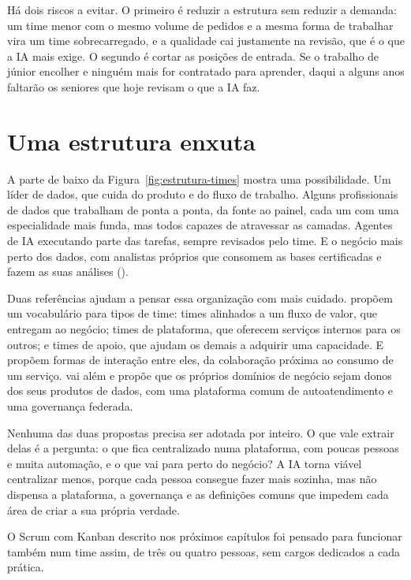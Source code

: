 Há dois riscos a evitar. O primeiro é reduzir a estrutura sem reduzir a demanda: um time menor
com o mesmo volume de pedidos e a mesma forma de trabalhar vira um time sobrecarregado, e a
qualidade cai justamente na revisão, que é o que a IA mais exige. O segundo é cortar as
posições de entrada. Se o trabalho de júnior encolher e ninguém mais for contratado para
aprender, daqui a alguns anos faltarão os seniores que hoje revisam o que a IA faz.

\section{Uma estrutura enxuta}
\label{sec:estrutura-enxuta}

A parte de baixo da Figura~\ref{fig:estrutura-times} mostra uma possibilidade. Um líder de
dados, que cuida do produto e do fluxo de trabalho. Alguns profissionais de dados que
trabalham de ponta a ponta, da fonte ao painel, cada um com uma especialidade mais funda, mas
todos capazes de atravessar as camadas. Agentes de IA executando parte das tarefas, sempre
revisados pelo time. E o negócio mais perto dos dados, com analistas próprios que consomem as
bases certificadas e fazem as suas análises ().

Duas referências ajudam a pensar essa organização com mais cuidado. \textcite{skelton2019}
propõem um vocabulário para tipos de time: times alinhados a um fluxo de valor, que entregam
ao negócio; times de plataforma, que oferecem serviços internos para os outros; e times de
apoio, que ajudam os demais a adquirir uma capacidade. E propõem formas de interação entre
eles, da colaboração próxima ao consumo de um serviço. \textcite{dehghani2022} vai além e
propõe que os próprios domínios de negócio sejam donos dos seus produtos de dados, com uma
plataforma comum de autoatendimento e uma governança federada.

Nenhuma das duas propostas precisa ser adotada por inteiro. O que vale extrair delas é a
pergunta: o que fica centralizado numa plataforma, com poucas pessoas e muita automação, e o
que vai para perto do negócio? A IA torna viável centralizar menos, porque cada pessoa
consegue fazer mais sozinha, mas não dispensa a plataforma, a governança e as definições
comuns que impedem cada área de criar a sua própria verdade.

O Scrum com Kanban descrito nos próximos capítulos foi pensado para funcionar também num time
assim, de três ou quatro pessoas, sem cargos dedicados a cada prática.

